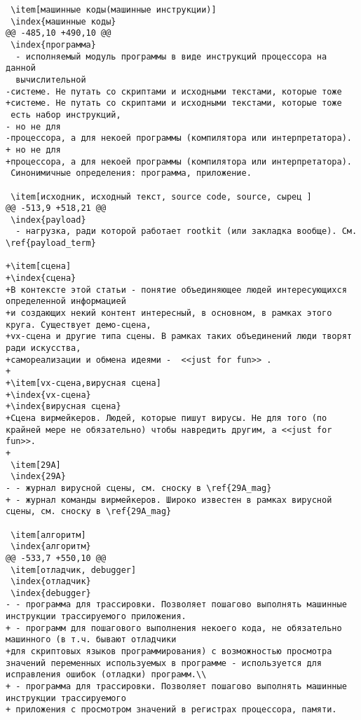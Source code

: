 \begin{verbatim}
 \item[машинные коды(машинные инструкции)]
 \index{машинные коды}
@@ -485,10 +490,10 @@
 \index{программа}
  - исполняемый модуль программы в виде инструкций процессора на данной
  вычислительной
-системе. Не путать со скриптами и исходными текстами, которые тоже
+системе. Не путать со скриптами и исходными текстами, которые тоже
 есть набор инструкций,
- но не для
-процессора, а для некоей программы (компилятора или интерпретатора).
+ но не для
+процессора, а для некоей программы (компилятора или интерпретатора).
 Синонимичные определения: программа, приложение.

 \item[исходник, исходный текст, source code, source, сырец ]
@@ -513,9 +518,21 @@
 \index{payload}
  - нагрузка, ради которой работает rootkit (или закладка вообще). См. \ref{payload_term}

+\item[сцена]
+\index{сцена}
+В контексте этой статьи - понятие объединяющее людей интересующихся определенной информацией
+и создающих некий контент интересный, в основном, в рамках этого круга. Существует демо-сцена,
+vx-сцена и другие типа сцены. В рамках таких объединений люди творят ради искусства,
+самореализации и обмена идеями -  <<just for fun>> .
+
+\item[vx-сцена,вирусная сцена]
+\index{vx-сцена}
+\index{вирусная сцена}
+Сцена вирмейкеров. Людей, которые пишут вирусы. Не для того (по крайней мере не обязательно) чтобы навредить другим, а <<just for fun>>.
+
 \item[29A]
 \index{29A}
- - журнал вирусной сцены, см. сноску в \ref{29A_mag}
+ - журнал команды вирмейкеров. Широко известен в рамках вирусной сцены, см. сноску в \ref{29A_mag}

 \item[алгоритм]
 \index{алгоритм}
@@ -533,7 +550,10 @@
 \item[отладчик, debugger]
 \index{отладчик}
 \index{debugger}
- - программа для трассировки. Позволяет пошагово выполнять машинные инструкции трассируемого приложения.
+ - программ для пошагового выполнения некоего кода, не обязательно машинного (в т.ч. бывают отладчики
+для скриптовых языков программирования) с возможностью просмотра значений переменных используемых в программе - используется для исправления ошибок (отладки) программ.\\
+ - программа для трассировки. Позволяет пошагово выполнять машинные инструкции трассируемого
+ приложения с просмотром значений в регистрах процессора, памяти.


\end{verbatim}
